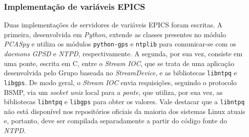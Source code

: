 % 
% 
% 

\subsubsection{Implementação de variáveis EPICS}
\label{sec:pvsgps}

Duas implementações de servidores de variáveis EPICS foram escritas. A primeira,
desenvolvida em \textit{Python}, extende as classes presentes no módulo
\textit{PCASpy} e utiliza os módulos \texttt{python-gps} e \texttt{ntplib} para
comunicar-se com os \textit{daemons} \textit{GPSD} e \textit{NTPD},
respectivamente. A segunda, por sua vez, consiste em uma ponte, escrita em C,
entre o \textit{Stream IOC}, que se trata de uma aplicação desenvolvida pelo
Grupo baseada no \textit{StreamDevice}, e as bibliotecas \texttt{libntpq} e
\texttt{libgps}.
De modo geral, o \textit{Stream IOC} envia requisições, seguindo o protocolo
BSMP, via um \textit{socket unix} local para a \textit{ponte}, que utiliza, por
sua vez, as bibliotecas \texttt{libntpq} e \texttt{libgps} para obter os valores. Vale
destacar que a \texttt{libntpq} não está disponível nos repositórios oficiais da
maioria dos sistemas Linux atuais e, portanto, deve ser compilada separadamente
a partir do código fonte do \textit{NTPD}.

